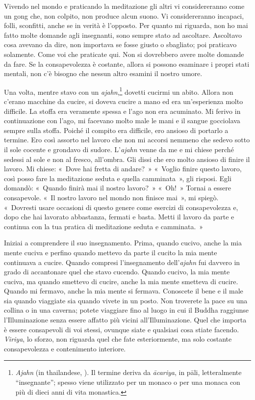 Vivendo nel mondo e praticando la meditazione gli altri vi
considereranno come un gong che, non colpito, non produce alcun suono.
Vi considereranno incapaci, folli, sconfitti, anche se in verità è
l'opposto. Per quanto mi riguarda, non ho mai fatto molte domande agli
insegnanti, sono sempre stato ad ascoltare. Ascoltavo cosa avevano da
dire, non importava se fosse giusto o sbagliato; poi praticavo
solamente. Come voi che praticate qui. Non si dovrebbero avere molte
domande da fare. Se la consapevolezza è costante, allora si possono
esaminare i propri stati mentali, non c'è bisogno che nessun altro
esamini il nostro umore.

Una volta, mentre stavo con un \emph{ajahn},\footnote{\emph{Ajahn} (in
  thailandese,
  \href{http://www.thai2english.com/dictionary/1453955.html}{}).
  Il termine deriva da \emph{ācariya}, in pāli, letteralmente
  ``insegnante''; spesso viene utilizzato per un monaco o per una monaca
  con più di dieci anni di vita monastica.} dovetti cucirmi un abito.
Allora non c'erano macchine da cucire, si doveva cucire a mano ed era
un'esperienza molto difficile. La stoffa era veramente spessa e l'ago
non era acuminato. Mi ferivo in continuazione con l'ago, mi facevano
molto male le mani e il sangue gocciolava sempre sulla stoffa. Poiché il
compito era difficile, ero ansioso di portarlo a termine. Ero così
assorto nel lavoro che non mi accorsi nemmeno che sedevo sotto il sole
cocente e grondavo di sudore. L'\emph{ajahn} venne da me e mi chiese
perché sedessi al sole e non al fresco, all'ombra. Gli dissi che ero
molto ansioso di finire il lavoro. Mi chiese: «~Dove hai fretta di
andare?~» «~Voglio finire questo lavoro, così posso fare la meditazione
seduta e quella camminata~», gli risposi. Egli domandò: «~Quando finirà
mai il nostro lavoro?~» «~Oh!~» Tornai a essere consapevole. «~Il nostro
lavoro nel mondo non finisce mai~», mi spiegò. «~Dovresti usare
occasioni di questo genere come esercizi di consapevolezza e, dopo che
hai lavorato abbastanza, fermati e basta. Metti il lavoro da parte e
continua con la tua pratica di meditazione seduta e camminata.~»

Iniziai a comprendere il suo insegnamento. Prima, quando cucivo, anche
la mia mente cuciva e perfino quando mettevo da parte il cucito la mia
mente continuava a cucire. Quando compresi l'insegnamento
dell'\emph{ajahn} fui davvero in grado di accantonare quel che stavo
cucendo. Quando cucivo, la mia mente cuciva, ma quando smettevo di
cucire, anche la mia mente smetteva di cucire. Quando mi fermavo, anche
la mia mente si fermava. Conoscete il bene e il male sia quando
viaggiate sia quando vivete in un posto. Non troverete la pace su una
collina o in una caverna; potete viaggiare fino al luogo in cui il
Buddha raggiunse l'Illuminazione senza essere affatto più vicini
all'Illuminazione. Quel che importa è essere consapevoli di voi stessi,
ovunque siate e qualsiasi cosa stiate facendo. \emph{Viriya}, lo sforzo,
non riguarda quel che fate esteriormente, ma solo costante
consapevolezza e contenimento interiore.

